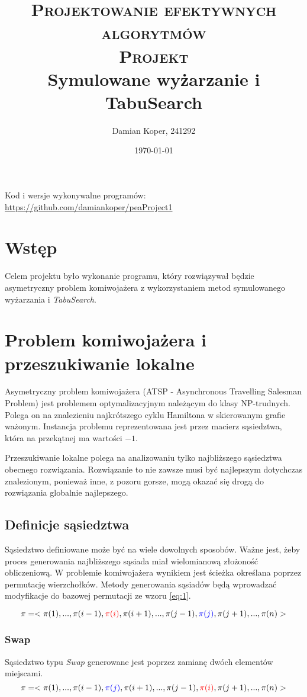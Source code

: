 \documentclass[12pt]{article}
\title{ 
    \vspace*{50mm}
    \textsc{
        \textbf{Projektowanie efektywnych algorytmów}\\
    \vspace*{10mm}
    \large Projekt\\
        }
        \normalsize
         Symulowane wyżarzanie i TabuSearch
         \vspace*{5mm}
         }
\author{
Damian Koper,  241292\\
}
\date{\today}
\begin{document}
\maketitle

\newpage
\setcounter{tocdepth}{2}
\localtableofcontents
\listoffigures
\listoftables
\vfill
Kod i wersje wykonywalne programów: \url{https://github.com/damiankoper/peaProject1}
\newpage

\section{Wstęp}
Celem projektu było wykonanie programu, który rozwiązywał będzie asymetryczny
problem komiwojażera z wykorzystaniem metod symulowanego wyżarzania i \textit{TabuSearch}.
\section{Problem komiwojażera i przeszukiwanie lokalne}
Asymetryczny problem komiwojażera (ATSP - Asynchronous Travelling Salesman Problem) jest problemem optymalizacyjnym należącym do klasy NP-trudnych.
Polega on na znalezieniu najkrótszego cyklu Hamiltona w skierowanym grafie ważonym. Instancja problemu reprezentowana jest przez macierz sąsiedztwa, która na
przekątnej ma wartości $-1$.

Przeszukiwanie lokalne polega na analizowaniu tylko najbliższego sąsiedztwa obecnego rozwiązania. Rozwiązanie to nie zawsze musi być
najlepszym dotychczas znalezionym, ponieważ inne, z pozoru gorsze, mogą okazać się drogą do rozwiązania globalnie najlepszego.

\subsection{Definicje sąsiedztwa}
Sąsiedztwo definiowane może być na wiele dowolnych sposobów. Ważne jest, żeby proces generowania najbliższego sąsiada miał wielomianową złożoność obliczeniową.
W problemie komiwojażera wynikiem jest ścieżka określana poprzez permutację wierzchołków. Metody generowania sąsiadów będą wprowadzać modyfikacje do bazowej permutacji ze wzoru \ref{eq:1}.

\begin{equation}
    \label{eq:1}
    \pi=<\pi(1),...,\pi(i-1),\mathbin{\color{red}\pi(i)},\pi(i+1),...,\pi(j-1),\mathbin{\color{blue}\pi(j)},\pi(j+1),...,\pi(n)>
\end{equation}

\subsubsection{Swap}
Sąsiedztwo typu \textit{Swap} generowane jest poprzez zamianę dwóch elementów miejscami.
\begin{equation}
    \label{eq:2}
    \pi=<\pi(1),...,\pi(i-1),\mathbin{\color{blue}\pi(j)},\pi(i+1),...,\pi(j-1),\mathbin{\color{red}\pi(i)},\pi(j+1),...,\pi(n)>
\end{equation}
\end{document}
